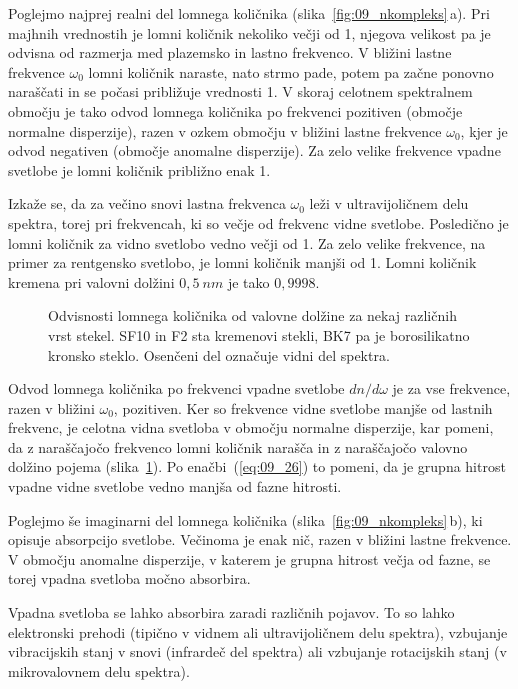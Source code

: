 Poglejmo najprej realni del lomnega količnika (slika~\ref{fig:09_nkompleks}\,a). 
Pri majhnih vrednostih je lomni količnik nekoliko večji od 1, 
njegova velikost pa je odvisna od razmerja med plazemsko in lastno frekvenco.
V bližini lastne frekvence $\omega_0$ lomni količnik naraste, nato strmo pade, potem pa 
začne ponovno naraščati in se počasi približuje vrednosti 1. V skoraj celotnem 
spektralnem območju je tako odvod lomnega količnika po frekvenci pozitiven 
(območje normalne disperzije), razen v ozkem območju v bližini lastne 
frekvence $\omega_0$, kjer je odvod negativen (območje anomalne disperzije). 
Za zelo velike frekvence vpadne svetlobe je lomni količnik približno enak 1.

Izkaže se, da za večino snovi lastna frekvenca $\omega_0$
leži v ultravijoličnem delu spektra, torej pri frekvencah, ki so večje od
frekvenc vidne svetlobe. Posledično je lomni količnik za vidno svetlobo 
vedno večji od 1. Za zelo velike frekvence, na primer za rentgensko svetlobo,
je lomni količnik manjši od 1. Lomni količnik kremena pri valovni 
dolžini $0,5~\si{nm}$ je tako $0,9998$. 
\begin{figure}[h]
\centering
\def\svgwidth{80truemm} 

\caption{Odvisnosti lomnega količnika od valovne dolžine za nekaj različnih vrst stekel. SF10
 in F2 sta kremenovi stekli, BK7 pa je borosilikatno kronsko steklo. Osenčeni 
 del označuje vidni del spektra.}
\label{fig:09_stekla}
\end{figure}

Odvod lomnega količnika po frekvenci vpadne svetlobe $dn/d\omega$
je za vse frekvence, razen v bližini $\omega_0$, pozitiven. 
Ker so frekvence vidne svetlobe manjše od lastnih frekvenc, je celotna
vidna svetloba v območju normalne disperzije, kar pomeni, da z naraščajočo
frekvenco lomni količnik narašča in z naraščajočo valovno dolžino pojema (slika~\ref{fig:09_stekla}). 
Po enačbi~(\ref{eq:09_26}) to pomeni, da je grupna hitrost vpadne vidne 
svetlobe vedno manjša od fazne hitrosti. 

Poglejmo še imaginarni del lomnega količnika (slika~\ref{fig:09_nkompleks}\,b), ki 
opisuje absorpcijo svetlobe. Večinoma je enak nič, razen v bližini lastne frekvence. 
V območju anomalne disperzije, v katerem je grupna hitrost večja od fazne, se 
torej vpadna svetloba močno absorbira. 

\begin{remark}
Vpadna svetloba se lahko absorbira zaradi različnih pojavov. To so lahko 
elektronski prehodi (tipično v vidnem ali ultravijoličnem delu spektra), 
vzbujanje vibracijskih stanj v snovi (infrardeč del spektra) ali 
vzbujanje rotacijskih stanj (v mikrovalovnem delu spektra).
\end{remark}

